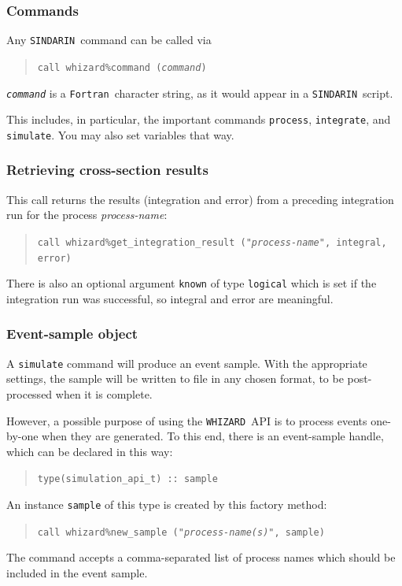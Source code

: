 \documentclass[12pt]{book}
\newcommand{\ttt}[1]{\texttt{#1}}
\newcommand{\whizard}{\ttt{WHIZARD}}
\newcommand{\sindarin}{\ttt{SINDARIN}}
\newcommand{\fortran}{\ttt{Fortran}}
\begin{document}
\subsubsection{Commands}
Any \sindarin\ command can be called via
\begin{quote}
  \tt call whizard\%command (\textit{command})
\end{quote}
\ttt{\it command} is a \fortran\ character string, as it would appear
in a \sindarin\ script.

This includes, in particular, the important commands \ttt{process},
\ttt{integrate}, and \ttt{simulate}.  You may also set variables that way.

\subsubsection{Retrieving cross-section results}
This call returns the results (integration and error) from a preceding
integration run for the process \textit{process-name}:
\begin{quote}
  \tt call whizard\%get\_integration\_result ("\textit{process-name}",
  integral, error)
\end{quote}
There is also an optional argument \ttt{known} of type \ttt{logical} which is
set if the integration run was successful, so integral and error are
meaningful.



\subsubsection{Event-sample object}
A \ttt{simulate} command will produce an event sample.  With the appropriate
settings, the sample will be written to file in any chosen format, to be
post-processed when it is complete.

However, a possible purpose of using the \whizard\ API is to process events one-by-one
when they are generated.  To this end, there is an event-sample handle, which
can be declared in this way:
\begin{quote}
  \tt type(simulation\_api\_t) :: sample
\end{quote}
An instance \ttt{sample} of this type is created by this factory method:
\begin{quote}
  \tt call whizard\%new\_sample ("\textit{process-name(s)}", sample)
\end{quote}
The command accepts a comma-separated list of process names which should be
included in the event sample.
\end{document}

